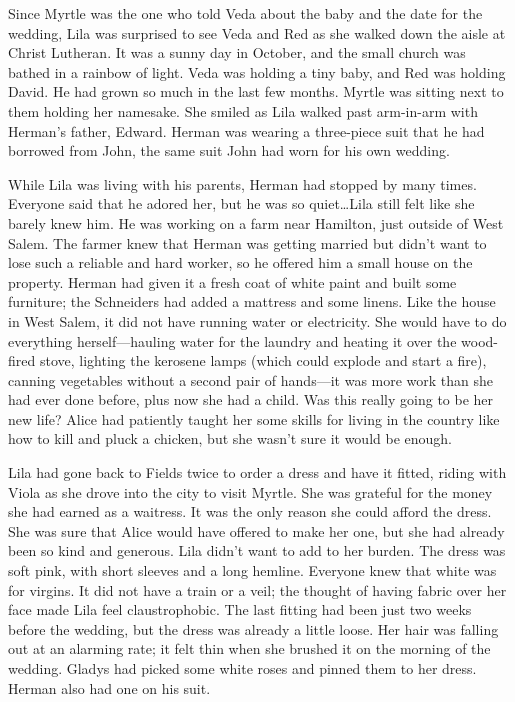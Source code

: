 \documentclass[
  letterpaper,
]{book}
\begin{document}
Since Myrtle was the one who told Veda about the baby and the date for
the wedding, Lila was surprised to see Veda and Red as she walked down
the aisle at Christ Lutheran. It was a sunny day in October, and the
small church was bathed in a rainbow of light. Veda was holding a tiny
baby, and Red was holding David. He had grown so much in the last few
months. Myrtle was sitting next to them holding her namesake. She smiled
as Lila walked past arm-in-arm with Herman's father, Edward. Herman was
wearing a three-piece suit that he had borrowed from John, the same suit
John had worn for his own wedding.

While Lila was living with his parents, Herman had stopped by many
times. Everyone said that he adored her, but he was so quiet\ldots Lila
still felt like she barely knew him. He was working on a farm near
Hamilton, just outside of West Salem. The farmer knew that Herman was
getting married but didn't want to lose such a reliable and hard worker,
so he offered him a small house on the property. Herman had given it a
fresh coat of white paint and built some furniture; the Schneiders had
added a mattress and some linens. Like the house in West Salem, it did
not have running water or electricity. She would have to do everything
herself---hauling water for the laundry and heating it over the
wood-fired stove, lighting the kerosene lamps (which could explode and
start a fire), canning vegetables without a second pair of hands---it
was more work than she had ever done before, plus now she had a child.
Was this really going to be her new life? Alice had patiently taught her
some skills for living in the country like how to kill and pluck a
chicken, but she wasn't sure it would be enough.

Lila had gone back to Fields twice to order a dress and have it fitted,
riding with Viola as she drove into the city to visit Myrtle. She was
grateful for the money she had earned as a waitress. It was the only
reason she could afford the dress. She was sure that Alice would have
offered to make her one, but she had already been so kind and generous.
Lila didn't want to add to her burden. The dress was soft pink, with
short sleeves and a long hemline. Everyone knew that white was for
virgins. It did not have a train or a veil; the thought of having fabric
over her face made Lila feel claustrophobic. The last fitting had been
just two weeks before the wedding, but the dress was already a little
loose. Her hair was falling out at an alarming rate; it felt thin when
she brushed it on the morning of the wedding. Gladys had picked some
white roses and pinned them to her dress. Herman also had one on his
suit.
\end{document}
